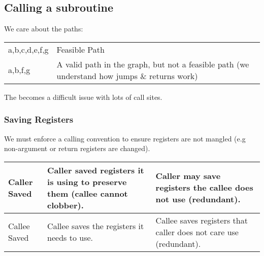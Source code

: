 \documentclass{report}
\begin{document}
\subsection*{Calling a subroutine}
We care about the  paths:
\begin{center}
	\begin{tabular}{l l}
		a,b,c,d,e,f,g & Feasible Path                                                                                \\
		a,b,f,g       & A valid path in the graph, but not a feasible path (we understand how jumps \& returns work)
	\end{tabular}
\end{center}
The  becomes a difficult issue with lots of call sites.

\subsubsection*{Saving Registers}
We must enforce a calling convention to ensure registers are not mangled (e.g non-argument or return registers are changed).
\begin{center}
	\begin{tabular}{l p{} p{}}
		Caller Saved & Caller saved registers it is using to preserve them (callee cannot clobber). & Caller may save registers the callee does not use (redundant).    \\
		\hline
		Callee Saved & Callee saves the registers it needs to use.                                  & Callee saves registers that caller does not care use (redundant). \\
	\end{tabular}
\end{center}
\end{document}
